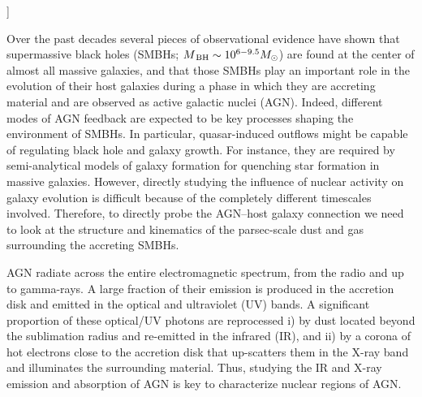 \documentclass{natureprintstyle}
\begin{document}
  ]
{
  \renewcommand{\thefootnote}%
    {\fnsymbol{footnote}}
}

Over the past decades several pieces of observational evidence have shown that supermassive black holes (SMBHs; $M_{\rm\,BH}\sim 10^{6-9.5}M_{\odot}$) 
are found at the center of almost all massive galaxies, and that those SMBHs play an important role in the evolution of their host galaxies\cite{Kormendy:2013uf} 
during a phase in which they are accreting material and are observed as active galactic nuclei (AGN). Indeed, different modes of AGN feedback are expected to be 
key processes shaping the environment of SMBHs. In particular, quasar-induced outflows might be capable of regulating black hole and galaxy growth\cite{DiMatteo05}. 
For instance, they are required by semi-analytical models of galaxy formation for quenching star formation in massive galaxies\cite{Croton06}. However, directly 
studying the influence of nuclear activity on galaxy evolution is difficult because of the completely different timescales involved\cite{Hickox14,Schawinski:2015cs}. 
{Therefore, to directly probe the AGN--host galaxy connection we need to look at the structure and kinematics of the parsec-scale dust and gas surrounding the 
accreting SMBHs.}



AGN radiate across the entire electromagnetic spectrum, from the radio {and up to gamma-rays}. A large fraction of their emission is produced in the accretion disk and emitted in the optical and ultraviolet (UV) bands.
 {A significant proportion of these optical/UV photons are reprocessed i) by dust located beyond the sublimation radius and re-emitted in the infrared (IR), and ii) by a corona of hot electrons close to the accretion disk that up-scatters them in the X-ray band\cite{Haardt:1994bq} and illuminates the surrounding material. Thus, studying the IR and X-ray emission and absorption of AGN is key to characterize nuclear regions of AGN.} 
\end{document}

